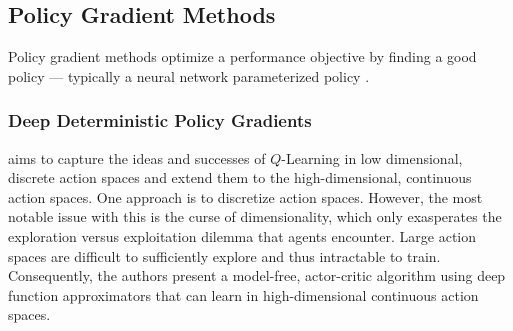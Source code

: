 \subsection{Policy Gradient Methods}

Policy gradient methods optimize a performance objective by finding a good policy
--- typically a neural network parameterized policy \cite{introtodeeprl}. 

\subsubsection{Deep Deterministic Policy Gradients}

\cite{ddpg} aims to capture the ideas and successes of $Q$-Learning \cite{q-learning} in low dimensional, discrete action spaces and extend them 
to the high-dimensional, continuous action spaces. One approach is to discretize action spaces. However, the most notable issue 
with this is the curse of dimensionality, which only exasperates the exploration versus exploitation dilemma that 
agents encounter. Large action spaces are difficult to sufficiently explore and thus intractable to train. Consequently, 
the authors present a model-free, actor-critic algorithm using deep function approximators that can learn in 
high-dimensional continuous action spaces.

